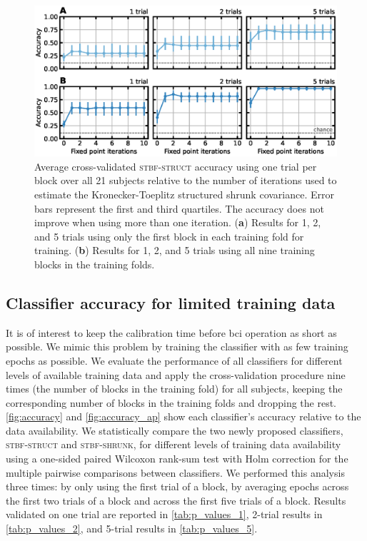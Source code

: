   \begin{figure}
		\includegraphics[width=\linewidth]{figures/stbf_struct/fpi.eps}
    \caption[Average cross-validated \textsc{stbf-struct} accuracy]{%
      Average cross-validated \textsc{stbf-struct} accuracy using
			one trial per block over all 21 subjects
			relative to the number of iterations used to estimate the Kronecker-Toeplitz structured shrunk
			covariance. Error bars represent the first and third quartiles. The
			accuracy does not improve when using more than one iteration.
			(\textbf{a}) Results for 1, 2, and 5 trials using only the first block in each
			training fold for training. (\textbf{b}) Results
			for 1, 2, and 5 trials using
			all nine training blocks in the training folds.
		}
		\label{fig:iterations}
	\end{figure}

	\subsection{Classifier accuracy for limited training data}
	It is of interest to keep the calibration time before \ac{bci}
	operation as short as possible.
	We mimic this problem by training the classifier with as few training epochs as possible.
	We evaluate the performance of all classifiers for different levels of
	available training data and apply the cross-validation procedure nine times (the number of blocks in the training fold) for all subjects, keeping the
	corresponding number of blocks in the training folds and dropping the rest.
	\cref{fig:accuracy} and \cref{fig:accuracy_ap} show each classifier's
	accuracy relative to the data availability.
	We statistically compare the two newly proposed classifiers,
	\textsc{stbf-struct} and \textsc{stbf-shrunk}, for different levels of training
	data availability using a one-sided paired Wilcoxon rank-sum test with Holm correction for the multiple pairwise comparisons between classifiers.
	We performed this analysis three times: by only using the first trial of a
	block, by averaging epochs across the first two trials of a block and across
	the first five trials of a block.
	Results validated on one trial are reported in \cref{tab:p_values_1}, 2-trial results
	in \cref{tab:p_values_2}, and 5-trial results in \cref{tab:p_values_5}.

